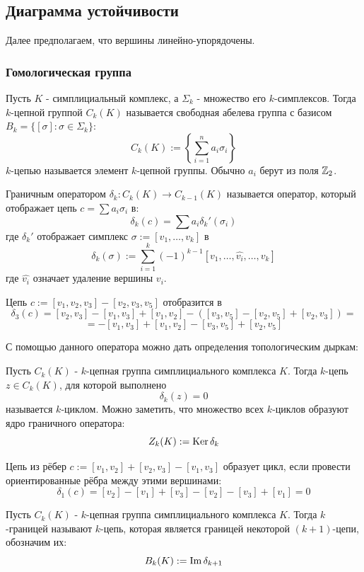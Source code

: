 \documentclass{article}
\begin{document}
\subsection{Диаграмма устойчивости}
Далее предполагаем, что вершины линейно-упорядочены.
\subsubsection{Гомологическая группа}
\begin{definition}
  Пусть $K$ - симплициальный комплекс, а $\Sigma_k$ - множество его $k$-симплексов. Тогда $k$-цепной группой $C_k(K)$ называется свободная абелева группа с базисом $B_k = \{[\sigma] \colon \sigma \in \Sigma_k\}$:
  \[C_k(K) := \left\{\sum_{i=1}^n a_i\sigma_i\right\}\]
  $k$-цепью называется элемент $k$-цепной группы. Обычно $a_i$ берут из поля $\mathbb{Z}_2$.
\end{definition}
\begin{definition}
  Граничным оператором $\delta_k \colon C_k(K) \to C_{k-1}(K)$ называется оператор, который отображает цепь $c = \sum a_i \sigma_i$ в:
  \[\delta_k(c) = \sum a_i \delta_k'(\sigma_i)\]
  где $\delta_k'$ отображает симплекс $\sigma:=[v_1,\dots,v_k]$ в
  \[\delta_k(\sigma) := \sum_{i=1}^k (-1)^{k-1} [v_1,\dots,\hat{v_i},\dots,v_k] \]
  где $\hat{v_i}$ означает удаление вершины $v_i$. 
\end{definition}
\begin{example}
Цепь $c := [v_1,v_2,v_3] - [v_2,v_3,v_5]$ отобразится в
\[\delta_3(c) = [v_2,v_3] - [v_1,v_3] + [v_1,v_2] - ([v_3,v_5] - [v_2,v_5] + [v_2,v_3]) = \]
\[=-[v_1,v_3] + [v_1,v_2] - [v_3,v_5] + [v_2,v_5]\]
\end{example}
С помощью данного оператора можно дать определения топологическим дыркам:
\begin{definition}
  Пусть $C_k(K)$ - $k$-цепная группа симплициального комплекса $K$. Тогда $k$-цепь $z\in C_k(K)$, для которой выполнено
  \[\delta_k(z) = 0\]
  называется $k$-циклом. Можно заметить, что множество всех $k$-циклов образуют ядро граничного оператора:
  \[Z_k(K) := \mathop{\rm Ker} \delta_k\]
\end{definition}
\begin{example}
  Цепь из рёбер $c := [v_1,v_2] + [v_2, v_3] - [v_1, v_3]$ образует цикл, если провести ориентированные рёбра между этими вершинами:
  \[\delta_1(c) = [v_2] - [v_1] + [v_3] - [v_2] - [v_3] + [v_1] = 0\]
\end{example}
\begin{definition}
  Пусть $C_k(K)$ - $k$-цепная группа симплициального комплекса $K$. Тогда $k$-границей называют $k$-цепь, которая является границей некоторой $(k+1)$-цепи, обозначим их:
  \[B_k(K) := \mathop{\rm Im} \delta_{k+1}\]
\end{definition}
\end{document}

